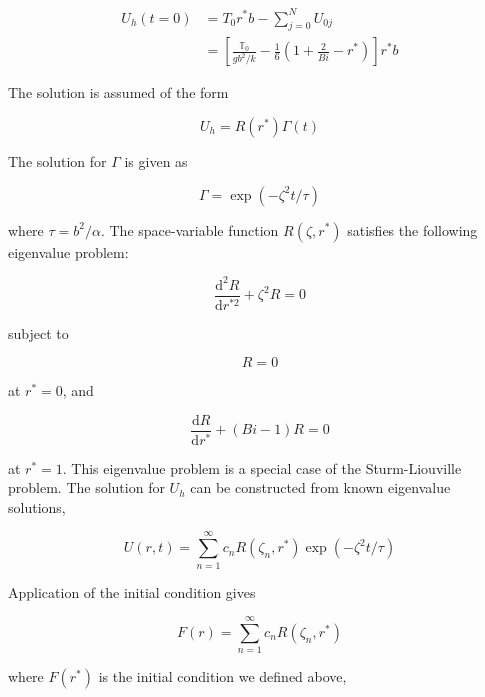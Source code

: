 \begin{align}
    U_h(t=0) &= T_0r^*b - \sum_{j=0}^N U_{0j}\\
    & = \left[\frac{\mathbb{T}_0}{gb^2/k} - \frac{1}{6}\left(1 + \frac{2}{Bi} - r^*\right)\right]r^*b
\end{align}


The solution is assumed of the form

\begin{equation}
    U_h = R(r^*) \Gamma(t)
\end{equation}

The solution for $\Gamma$ is given as

\begin{equation}
    \Gamma = \exp(-\zeta^2t/\tau)
\end{equation}

where $\tau = b^2/\alpha$. The space-variable function $R(\zeta,r^*)$ satisfies the following eigenvalue problem:

\begin{equation}\label{eq:eigen-function}
    \frac{\mathrm{d}^2R}{\mathrm{d}r^{*2}} + \zeta^2 R = 0
\end{equation}

subject to 

\begin{equation}
    R = 0
\end{equation}

at $r^* = 0$, and

\begin{equation}
    \frac{\mathrm{d}R}{\mathrm{d}r^*} + (Bi - 1)R = 0
\end{equation}

at $r^* = 1$. This eigenvalue problem is a special case of the Sturm-Liouville problem. The solution for $U_h$ can be constructed from known eigenvalue solutions,

\begin{equation}\label{eq:eigen-general-solution}
    U(r,t) = \sum_{n=1}^\infty c_n R(\zeta_n,r^*)\exp(-\zeta^2 t/\tau)
\end{equation}

Application of the initial condition gives

\begin{equation}\label{eq:eigen-initial-condition}
    F(r) = \sum_{n=1}^\infty c_n R(\zeta_n,r^*)
\end{equation}

where $F(r^*)$ is the initial condition we defined above, 

